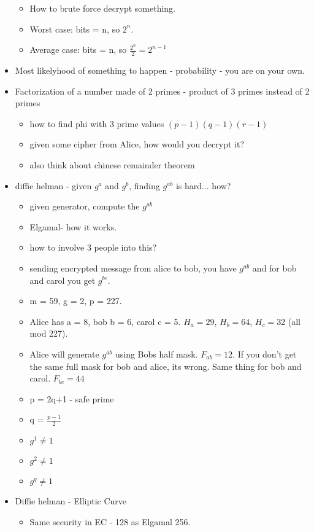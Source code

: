 \documentclass[12pt]{amsart}
\begin{document}
\begin{itemize}
\begin{itemize}
	\item{} How to brute force decrypt something.
	\item{} Worst case: bits = n, so $2^n$.
	\item{} Average case: bits = n, so $\frac{2^n}{2} = 2^{n-1}$
	\end{itemize}
\item{}Most likelyhood of something to happen - probability - you are on your own.
\item{}Factorization of a number made of 2 primes - product of 3 primes instead of 2 primes
	\begin{itemize}
	\item{}how to find phi with 3 prime values $(p-1)(q-1)(r-1)$
	\item{}given some cipher from Alice, how would you decrypt it?
	\item{}also think about chinese remainder theorem
	\end{itemize}
\item{}diffie helman - given $g^a$ and $g^b$, finding $g^{ab}$ is hard... how?
	\begin{itemize}
	\item{}given generator, compute the $g^{ab}$
	\item{}Elgamal- how it works.
	\item{}how to involve 3 people into this?
	\item{}sending encrypted message from alice to bob, you have $g^{ab}$ and for bob and carol you get $g^{bc}$.
	\item{}m = 59, g = 2, p = 227.  
	\item{}Alice has a = 8, bob b = 6, carol c = 5.  $H_a = 29$, $H_b = 64$, $H_c = 32$ (all mod 227).  
	\item{} Alice will generate $g^{ab}$ using Bobs half mask. $F_{ab} = 12$.  If you don't get the same full mask for bob and alice, its wrong.  Same thing for bob and carol.  $F_{bc} = 44$
	\item{}p = 2q+1 - safe prime
	\item{}q = $\frac{p-1}{2}$
	\item{}$g^1 \neq 1$
	\item{}$g^2 \neq 1$
	\item{}$g^q \neq 1$
	\end{itemize}
\item{}Diffie helman - Elliptic Curve
	\begin{itemize}
	\item{}Same security in EC - 128 as Elgamal 256.

\end{itemize}
\end{itemize}
\end{document}
